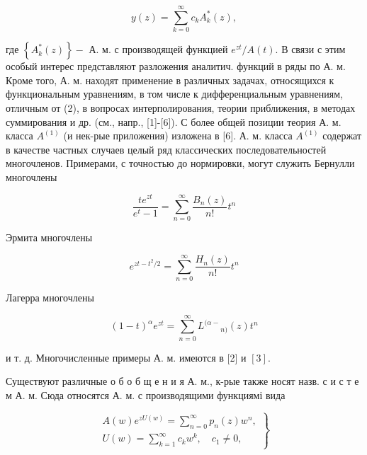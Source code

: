 \documentclass[10pt]{article}
\begin{document}
\[

y(z)=\sum_{k=0}^{\infty} c_{k} A_{k}^{*}(z),

\]



где $\left\{A_{k}^{*}(z)\right\}-$ А. м. с производящей функцией $e^{z t} / A(t)$. В связи с этим особый интерес представляют разложения аналитич. функций в ряды по А. м. Кроме того, А. м. находят применение в различных задачах, относящихся к функциональным уравнениям, в том числе к дифференциальным уравнениям, отличным от (2), в вопросах интерполирования, теории приближения, в методах суммирования и др. (см., напр., [1]-[6]). С более общей позиции теория А. м. класса $A^{(1)}$ (и нек-рые приложения) изложена в [6]. А. м. класса $A^{(1)}$ содержат в качестве частных случаев целый ряд классических последовательностей многочленов. Примерами, с точностью до нормировки, могут служить Бернулли многочлены



\[

\frac{t e^{z t}}{e^{t}-1}=\sum_{n=0}^{\infty} \frac{B_{n}(z)}{n !} t^{n}

\]



Эрмита многочлены



\[

e^{z t-t^{2} / 2}=\sum_{n=0}^{\infty} \frac{H_{n}(z)}{n !} t^{n}

\]



Лагерра многочлены



\[

(1-t)^{\alpha} e^{z t}=\sum_{n=0}^{\infty} L^{(\alpha-}{ }_{n)}(z) t^{n}

\]



и т. д. Многочисленные примеры А. м. имеются в [2] и $[3]$.



Существуют различные о б о б щ е н и я А. м., к-рые также носят назв. с и с т е м А. м. Сюда относятся А. м. с производящими функциямі вида



\[

\left.\begin{array}{l}

A(w) e^{z U(w)}=\sum_{n=0}^{\infty} p_{n}(z) w^{n}, \\

U(w)=\sum_{k=1}^{\infty} c_{k} w^{k}, \quad c_{1} \neq 0,

\end{array}\right\}

\]
\end{document}
